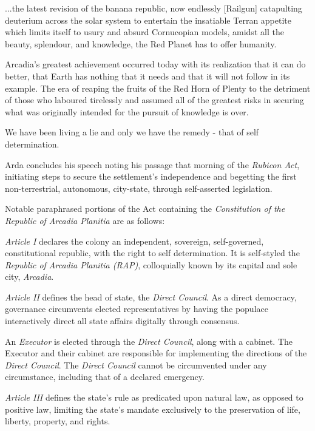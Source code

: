 \startTimelineDocument
...the latest revision of the banana republic, now endlessly [Railgun] catapulting deuterium across the solar system to entertain the insatiable Terran appetite which limits itself to usury and absurd Cornucopian models, amidst all the beauty, splendour, and knowledge, the Red Planet has to offer humanity.

Arcadia's greatest achievement occurred today with its realization that it can do better, that Earth has nothing that it needs and that it will not follow in its example. The era of reaping the fruits of the Red Horn of Plenty to the detriment of those who laboured tirelessly and assumed all of the greatest risks in securing what was originally intended for the pursuit of knowledge is over. 

We have been living a lie and only we have the remedy - that of self determination.
\stopTimelineDocument
\crlf

Arda concludes his speech noting his passage that morning of the {\it Rubicon Act}, initiating steps to secure the settlement's independence and begetting the first non-terrestrial, autonomous, city-state, through self-asserted legislation. 

Notable paraphrased portions of the Act containing the {\it Constitution of the Republic of Arcadia Planitia} are as follows:
\crlf

\startTimelineDocument
\startitemize[5]
\setupwhitespace[big]
\item {\it Article I} declares the colony an independent, sovereign, self-governed, constitutional republic, with the right to self determination. It is self-styled the {\it Republic of Arcadia Planitia (RAP)}, colloquially known by its capital and sole city, {\it Arcadia}.

\item {\it Article II} defines the head of state, the {\it Direct Council}. As a direct democracy, governance circumvents elected representatives by having the populace interactively direct all state affairs digitally through consensus. 

An {\it Executor} is elected through the {\it Direct Council}, along with a cabinet. The Executor and their cabinet are responsible for implementing the directions of the {\it Direct Council}. The {\it Direct Council} cannot be circumvented under any circumstance, including that of a declared emergency.

\item {\it Article III} defines the state's rule as predicated upon natural law, as opposed to positive law, limiting the state's mandate exclusively to the preservation of life, liberty, property, and rights.

